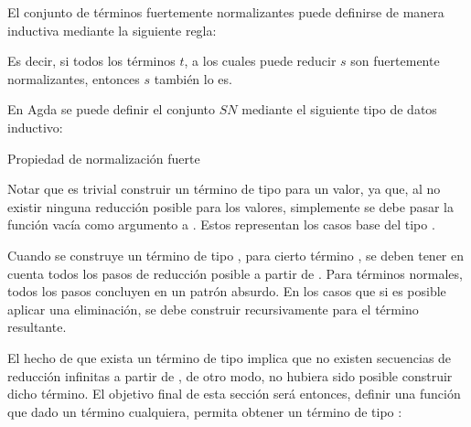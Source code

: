 El conjunto de términos fuertemente normalizantes puede definirse de manera inductiva mediante la siguiente regla:

\begin{center}
	\begin{prooftree}
	\end{prooftree}
\end{center}

Es decir, si todos los términos $t$, a los cuales puede reducir $s$ son fuertemente normalizantes, entonces $s$ también lo es. 

En Agda se puede definir el conjunto $SN$ mediante el siguiente tipo de datos inductivo: 

\begin{codigo}
	Propiedad de normalización fuerte
\end{codigo}

Notar que es trivial construir un término de tipo  para un valor, ya que, al no existir ninguna reducción posible para los valores, simplemente se debe pasar la función vacía como argumento a .
Estos representan los casos base del tipo .

\begin{example}
	Cuando se construye un término de tipo  , para cierto término , se deben tener en cuenta todos los pasos de reducción posible a partir de .
	Para términos normales, todos los pasos concluyen en un patrón absurdo.
	En los casos que si es posible aplicar una eliminación, se debe construir recursivamente  para el término resultante.
	
\end{example}

El hecho de que exista un término de tipo   implica que no existen secuencias de reducción infinitas a partir de , de otro modo, no hubiera sido posible construir dicho término.
El objetivo final de esta sección será entonces, definir una función que dado un término cualquiera, permita obtener un término de tipo  :

\vspace{0.5em}
\AgdaSymbol{:}
\AgdaSymbol{\{}
\AgdaSymbol{\}}
\AgdaSymbol{(}
\AgdaSymbol{:}
\AgdaSymbol{)}
\vspace{0.5em}

